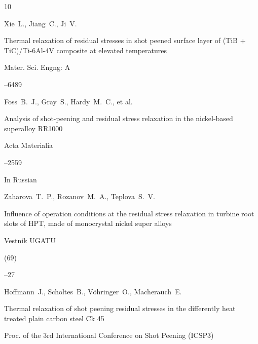 \begin{thebibliography}{10}

\by Xie~L., Jiang~C., Ji~V.

\paper Thermal relaxation of residual stresses in shot peened surface layer of (TiB + TiC)/Ti-6Al-4V composite at elevated temperatures

\jour Mater. Sci. Engng: A




--6489






\by Foss~B.~J., Gray~S., Hardy~M.~C., et al.

\paper Analysis of shot-peening and residual stress relaxation in the nickel-based superalloy RR1000

\jour Acta Materialia




--2559






\lang In Russian

\by Zaharova~T.~P., Rozanov~M.~A., Teplova~S.~V.

\paper Influence of operation conditions at the residual stress relaxation in turbine root slots of HPT, made of monocrystal nickel super alloys

\jour Vestnik UGATU 



 (69)

--27





\by Hoffmann~J., Scholtes~B., V\"ohringer~O., Macherauch~E.

\paper Thermal relaxation of shot peening residual stresses in the differently heat treated plain carbon steel Ck 45

\inbook Proc. of the 3rd International Conference on Shot Peening (ICSP3) 


\end{thebibliography}
